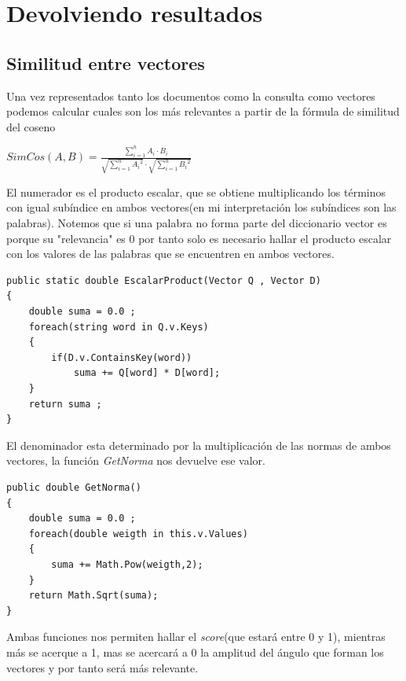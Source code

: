 \documentclass{article}
\begin{document}
\section{Devolviendo resultados}
\subsection{Similitud entre vectores}
Una vez representados tanto los documentos como la consulta como vectores podemos calcular cuales son los más relevantes a partir
de la fórmula de similitud del coseno

\begin{center}
    
    $SimCos(A,B) = \frac{\sum_{i = 1}^{n}A_i  \cdot  B_i}{\sqrt{\sum_{i = 1}^{n}{A_i}^2} \cdot \sqrt{\sum_{i = 1}^{n}{B_i}^2}   } $\\[10pt]
    
\end{center}

El numerador es el producto escalar, que se obtiene multiplicando los términos con igual subíndice en ambos vectores(en mi interpretación 
los subíndices son las palabras). Notemos que si una palabra no forma parte del diccionario vector es porque su "relevancia" es 0
por tanto solo es necesario hallar el producto escalar con los valores de las palabras que se encuentren en ambos vectores.
\\[5pt]

\begin{lstlisting}[language={[Sharp]C}]
public static double EscalarProduct(Vector Q , Vector D)
{
    double suma = 0.0 ;
    foreach(string word in Q.v.Keys)
    {
        if(D.v.ContainsKey(word))
            suma += Q[word] * D[word];
    }
    return suma ;
}

\end{lstlisting}

El denominador esta determinado por la multiplicación de las normas de ambos vectores, la función \textit{GetNorma} nos devuelve
ese valor. \\[5pt]

\begin{lstlisting}[language={[Sharp]C}]
public double GetNorma()
{
    double suma = 0.0 ;
    foreach(double weigth in this.v.Values)
    {
        suma += Math.Pow(weigth,2);
    }
    return Math.Sqrt(suma);
}
\end{lstlisting}
    
Ambas funciones nos permiten hallar el \textit{score}(que estará entre 0 y 1), mientras más se acerque a 1, mas se acercará
a 0 la amplitud del ángulo que forman los vectores y por tanto será más relevante.
\end{document}
